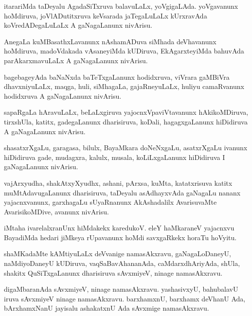 \documentclass{article}
\begin{document}
\begin{mn}
itarariMda taDeyalu AgadaSiTxruva balavuLaLx, yoVgigaLAda. yoVgavanunx
hoMdiruva, joVlADutitxruva keVsarada jaTegaLuLaLx kUrxravAda
koVredADegaLuLaLx A gaNagaLanunx nivArisu.
\end{mn}

\begin{mn}
AnegaLa kuMBasathxLavanunx nAshamADuva siMhada deVhavanunx hoMdiruva,
madoVdakada vAsaneyiMda kUDiruva, EkAgarxteyiMda bahuvAda
parAkarxmavuLaLx A gaNagaLanunx nivArisu.
\end{mn}

\begin{mn}
bagebageyAda baNaNxda baTeTxgaLanunx hodidxruva, viVrara gaMBiVra
dhavxniyuLaLx, maqga, huli, siMhagaLa, gajaRneyuLaLx, huliyu
camaRvanunx hodidxruva A gaNagaLanunx nivArisu.
\end{mn}

\begin{mn}%
sapaRgaLa hAravuLaLx, beLaLxgiruva yajocnxVpaviVtavanunx
hAkikoMDiruva, tirxshUla, katitx, gadegaLanunx dharisiruva, koDali,
hagagxgaLanunx hiDidiruva A gaNagaLanunx nivArisu.
\end{mn}

\begin{mn}
shasatxrXgaLu, garagasa, bilulx, BayaMkara doNeNxgaLu, asatxrXgaLu
ivanunx hiDidiruva gade, mudagxra, kalulx, musala, koLiLxgaLanunx
hiDidiruva I gaNagaLanunx nivArisu.
\end{mn}

\begin{mn}
vajArxyudha, shakAtxyXyudhx, ashani, pArxsa, kuMta, katatxrisuva
katitx muMtAdavugaLanunx dharisiruva, taDeyalu asAdhayxvAda gaNagaLu
nananx yajacnxvanunx, garxhagaLu sUyaRnanunx AkAshadalilx AvarisuvaMte
AvarisikoMDive, avanunx nivArisu.
\end{mn}

\begin{mn}
iMtaha ivarelalxranUnx hiMdakekx karedukoV. eleY haMkaraneV yajacnxvu
BayadiMda hedari jiMkeya rUpavanunx hoMdi savxgaRkekx horaTu hoVyitu.
\end{mn}

\begin{mn}
shaMKadaMte kAMtiyuLaLx deVvanige namasAkxravu, gaNagaLoDaneyU,
naMdiyoDaneyU kUDiruva, vaqSaBavAhananAda, caMdarxdhAriyAda, shUla,
shakitx QuSiTxgaLanunx dharisiruva sAvxmiyeV, ninage namasAkxravu.
\end{mn}

\begin{mn}%
digaMbaranAda sAvxmiyeV, ninage namasAkxravu. yashasivxyU, bahubalavU
iruva sAvxmiyeV ninage namasAkxravu. barxhamxnU, barxhamx deVhanU Ada,
bArxhamxNanU jayisalu ashakatxnU Ada sAvxmige namasAkxravu.
\end{mn}
\end{document}
